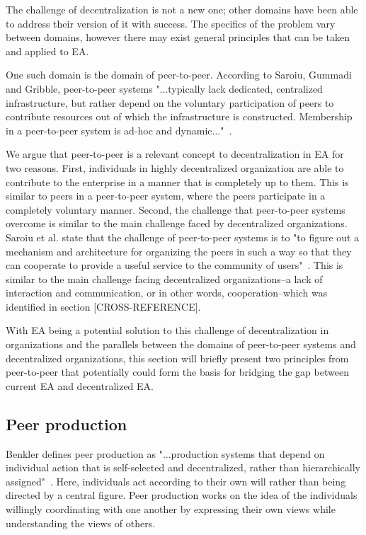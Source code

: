 The challenge of decentralization is not a new one; other domains have been able to address their version of it with success. The specifics of the problem vary between domains, however there may exist general principles that can be taken and applied to EA. 

One such domain is the domain of peer-to-peer. According to Saroiu, Gummadi and Gribble, peer-to-peer systems "...typically lack dedicated, centralized infrastructure, but rather depend on the voluntary participation of peers to contribute resources out of which the infrastructure is constructed. Membership in a peer-to-peer system is ad-hoc and dynamic..."~\cite{saroiu2001measurement}. 


We argue that peer-to-peer is a relevant concept to decentralization in EA for two reasons. First, individuals in highly decentralized organization are able to contribute to the enterprise in a manner that is completely up to them. This is similar to peers in a peer-to-peer system, where the peers participate in a completely voluntary manner. Second, the challenge that peer-to-peer systems overcome is similar to the main challenge faced by decentralized organizations. Saroiu et al. state that the challenge of peer-to-peer systems is to "to figure out a mechanism and architecture for organizing the peers in such a way so that they can cooperate to provide a useful service to the community of users"~\cite{saroiu2001measurement}. This is similar to the main challenge facing decentralized organizations--a lack of interaction and communication, or in other words, cooperation--which was identified in section [CROSS-REFERENCE]. 

With EA being a potential solution to this challenge of decentralization in organizations and the parallels between the domains of peer-to-peer systems and decentralized organizations, this section will briefly present two principles from peer-to-peer that potentially could form the basis for bridging the gap between current EA and decentralized EA. 

%
%

\subsection{Peer production}

Benkler defines peer production as "...production systems that depend on individual action that is self-selected and decentralized, rather than hierarchically assigned"~\cite{benkler2006wealth}. Here, individuals act according to their own will rather than being directed by a central figure. Peer production works on the idea of the individuals willingly coordinating with one another by expressing their own views while understanding the views of others. 

